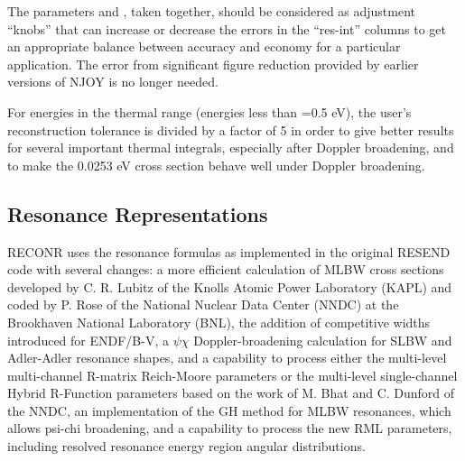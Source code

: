 \noindent
The parameters  and , taken together,
should be considered as adjustment ``knobs'' that can increase or
decrease the errors in the ``res-int'' columns to get an appropriate
balance between accuracy and economy for a particular application.
The error from significant figure reduction provided by earlier
versions of NJOY is no longer needed.

For energies in the thermal range (energies less than
=0.5 eV), the user's reconstruction
tolerance is
divided by a factor of 5 in order to give better results for
several important thermal integrals, especially after Doppler
broadening, and to make the 0.0253 eV cross section behave
well under Doppler broadening.

\subsection{Resonance Representations}
\label{ssRECONR_resrep}

RECONR uses the resonance formulas as implemented in the original
RESEND code\cite{RESEND} with several changes:  a
more efficient calculation of MLBW cross sections  developed by C. R. Lubitz of the
Knolls Atomic Power Laboratory (KAPL) and coded by P. Rose  of the National
Nuclear Data Center (NNDC)
 at
the Brookhaven National Laboratory (BNL), the addition of competitive widths
introduced for ENDF/B-V, a $\psi\chi$ Doppler-broadening calculation for SLBW and
Adler-Adler  resonance shapes, and a capability to
process either the multi-level multi-channel R-matrix
Reich-Moore parameters or
the multi-level single-channel Hybrid R-Function
parameters based on the work of
M. Bhat and C. Dunford of the NNDC,
an implementation of the GH method for MLBW resonances, which allows psi-chi broadening, and a capability
to process the new RML
parameters, including resolved resonance energy region angular distributions.

